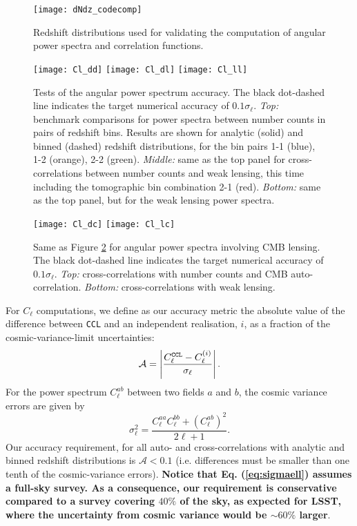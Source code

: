 \documentclass[\docopts]{\docclass}
\newcommand{\ccl}{{\tt CCL}\xspace}
\begin{document}
\begin{figure}
\centering
\texttt{[image: dNdz\_codecomp]}
\caption{Redshift distributions used for validating the computation of angular power spectra and correlation functions.}
\label{fig:zhistos}
\end{figure}
\begin{figure}
\texttt{[image: Cl\_dd]}
\texttt{[image: Cl\_dl]}
\texttt{[image: Cl\_ll]}
\caption{Tests of the angular power spectrum accuracy. The black dot-dashed line indicates the target numerical accuracy of $0.1\sigma_\ell$. {\sl Top:} benchmark comparisons for power spectra between number counts in pairs of redshift bins. Results are shown for analytic (solid) and binned (dashed) redshift distributions, for the bin pairs 1-1 (blue), 1-2 (orange), 2-2 (green). {\sl Middle:} same as the top panel for cross-correlations between number counts and weak lensing, this time including the tomographic bin combination 2-1 (red). {\sl Bottom:} same as the top panel, but for the weak lensing power spectra.}
\label{fig:cls_limber}
\end{figure}
\begin{figure}
\texttt{[image: Cl\_dc]}
\texttt{[image: Cl\_lc]}
\caption{Same as Figure \ref{fig:cls_limber} for angular power spectra involving CMB lensing. The black dot-dashed line indicates the target numerical accuracy of $0.1\sigma_\ell$. {\sl Top:} cross-correlations with number counts and CMB auto-correlation. {\sl Bottom:} cross-correlations with weak lensing.}
\label{fig:cls_cmblens}
\end{figure}

For $C_\ell$ computations, we define as our accuracy metric the absolute value of the difference between \ccl and an independent realisation, $i$, as a fraction of the cosmic-variance-limit uncertainties:
\begin{equation}
  \mathcal{A}=\left|\frac{C_\ell^{\tt CCL}-C_\ell^{(i)}}{\sigma_\ell}\right|.
  \label{eq:errorCl}
\end{equation}
For the power spectrum $C^{ab}_\ell$ between two fields $a$ and $b$, the cosmic variance errors are given by
\begin{equation}
  \sigma_\ell^2=\frac{C^{aa}_\ell C^{bb}_\ell+(C^{ab}_\ell)^2}{2\ell+1}.
  \label{eq:sigmaell}
\end{equation}
Our accuracy requirement, for all auto- and cross-correlations with analytic and binned redshift distributions is $\mathcal{A}<0.1$ (i.e. differences must be smaller than one tenth of the cosmic-variance errors). {\bf Notice that Eq. (\ref{eq:sigmaell}) assumes a full-sky survey. As a consequence, our requirement is conservative compared to a survey covering $40\%$ of the sky, as expected for LSST, where the uncertainty from cosmic variance would be $\sim 60\%$ larger}.
\end{document}
